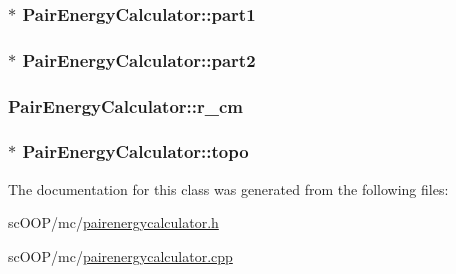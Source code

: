 \hypertarget{class_pair_energy_calculator_a168122b4b21b48d25093a9e314045929}{
\subsubsection[{part1}]{$\ast$ Pair\+Energy\+Calculator\+::part1\hspace{0.3cm}{\ttfamily [private]}}}\label{class_pair_energy_calculator_a168122b4b21b48d25093a9e314045929}
\hypertarget{class_pair_energy_calculator_a5930e66e7a0e9c3b2bd7e76391854ad2}{
\subsubsection[{part2}]{$\ast$ Pair\+Energy\+Calculator\+::part2\hspace{0.3cm}{\ttfamily [private]}}}\label{class_pair_energy_calculator_a5930e66e7a0e9c3b2bd7e76391854ad2}
\hypertarget{class_pair_energy_calculator_aa927503ba2066bfcd0fb072e0b7e12cc}{
\subsubsection[{r\+\_\+cm}]{ Pair\+Energy\+Calculator\+::r\+\_\+cm\hspace{0.3cm}{\ttfamily [private]}}}\label{class_pair_energy_calculator_aa927503ba2066bfcd0fb072e0b7e12cc}
\hypertarget{class_pair_energy_calculator_a89462e46d51f1247121a58a71831d2a2}{
\subsubsection[{topo}]{$\ast$ Pair\+Energy\+Calculator\+::topo\hspace{0.3cm}{\ttfamily [private]}}}\label{class_pair_energy_calculator_a89462e46d51f1247121a58a71831d2a2}


The documentation for this class was generated from the following files\+:\begin{DoxyCompactItemize}
\item 
sc\+O\+O\+P/mc/\hyperlink{pairenergycalculator_8h}{pairenergycalculator.\+h}\item 
sc\+O\+O\+P/mc/\hyperlink{pairenergycalculator_8cpp}{pairenergycalculator.\+cpp}\end{DoxyCompactItemize}

